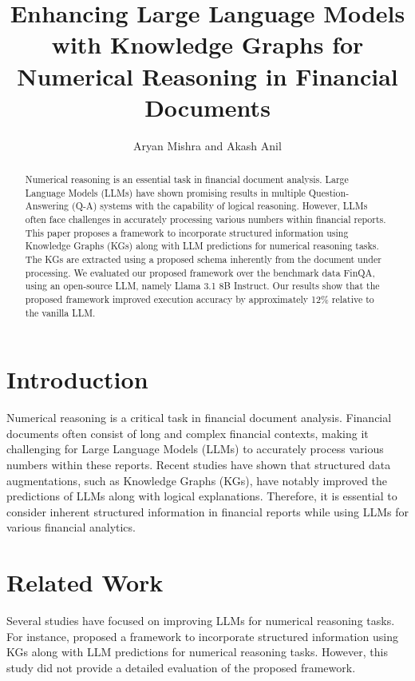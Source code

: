 \documentclass{article}
\begin{document}
\title{Enhancing Large Language Models with Knowledge Graphs for Numerical Reasoning in Financial Documents}

\author{Aryan Mishra and Akash Anil}

\maketitle

\begin{abstract}
Numerical reasoning is an essential task in financial document analysis. Large Language Models (LLMs) have shown promising results in multiple Question-Answering (Q-A) systems with the capability of logical reasoning. However, LLMs often face challenges in accurately processing various numbers within financial reports. This paper proposes a framework to incorporate structured information using Knowledge Graphs (KGs) along with LLM predictions for numerical reasoning tasks. The KGs are extracted using a proposed schema inherently from the document under processing. We evaluated our proposed framework over the benchmark data FinQA, using an open-source LLM, namely Llama 3.1 8B Instruct. Our results show that the proposed framework improved execution accuracy by approximately 12\% relative to the vanilla LLM.
\end{abstract}

\section{Introduction}

Numerical reasoning is a critical task in financial document analysis. Financial documents often consist of long and complex financial contexts, making it challenging for Large Language Models (LLMs) to accurately process various numbers within these reports. Recent studies have shown that structured data augmentations, such as Knowledge Graphs (KGs), have notably improved the predictions of LLMs along with logical explanations. Therefore, it is essential to consider inherent structured information in financial reports while using LLMs for various financial analytics.

\section{Related Work}

Several studies have focused on improving LLMs for numerical reasoning tasks. For instance, \citet{mishra2026structurefirstreasonnext} proposed a framework to incorporate structured information using KGs along with LLM predictions for numerical reasoning tasks. However, this study did not provide a detailed evaluation of the proposed framework.
\end{document}
